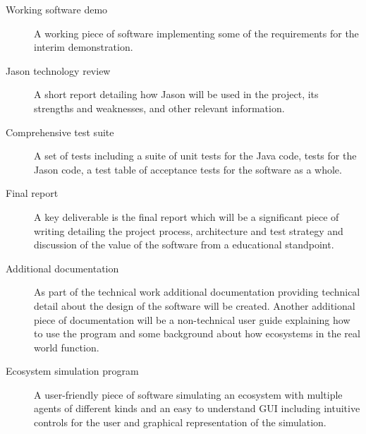 \documentclass[11pt,fleqn,twoside]{article}
\begin{document}
\begin{description}
	\item[Working software demo] A working piece of software implementing some of the requirements for the interim demonstration.
	\item[Jason technology review] A short report detailing how Jason will be used in the project, its strengths and weaknesses, and other relevant information.
	\item[Comprehensive test suite] A set of tests including a suite of unit tests for the Java code, tests for the Jason code, a test table of acceptance tests for the software as a whole.
	\item[Final report] A key deliverable is the final report which will be a significant piece of writing detailing the project process, architecture and test strategy and discussion of the value of the software from a educational standpoint.
	\item[Additional documentation] As part of the technical work additional documentation providing technical detail about the design of the software will be created. Another additional piece of documentation will be a non-technical user guide explaining how to use the program and some background about how ecosystems in the real world function.
	\item[Ecosystem simulation program] A user-friendly piece of software simulating an ecosystem with multiple agents of different kinds and an easy to understand GUI including intuitive controls for the user and graphical representation of the simulation.
\end{description}
\nocite{*} %

\newpage
{} 



\renewcommand{\refname}{Annotated Bibliography}  %
\end{document}

